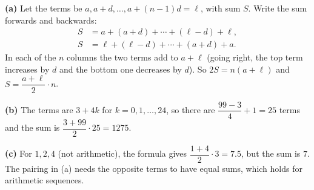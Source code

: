 \textbf{(a)} Let the terms be $a,a+d,\dots,a+(n-1)d=\ell$, with sum $S$. Write the sum forwards and backwards:
\[
\begin{aligned}
S&=a+(a+d)+\cdots+(\ell-d)+\ell,\\
S&=\ell+(\ell-d)+\cdots+(a+d)+a .
\end{aligned}
\]
In each of the $n$ columns the two terms add to $a+\ell$ (going right, the top term increases by $d$ and the bottom one decreases by $d$). So $2S=n(a+\ell)$ and $S=\dfrac{a+\ell}{2}\cdot n$.

\textbf{(b)} The terms are $3+4k$ for $k=0,1,\dots,24$, so there are $\dfrac{99-3}{4}+1=25$ terms and the sum is $\dfrac{3+99}{2}\cdot25=\boxed{1275}$.

\textbf{(c)} For $1,2,4$ (not arithmetic), the formula gives $\dfrac{1+4}{2}\cdot3=7.5$, but the sum is $7$. The pairing in (a) needs the opposite terms to have equal sums, which holds for arithmetic sequences.
